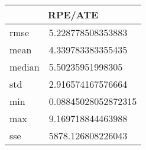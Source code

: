 \begin{table}[!ht] 
 \centering 
 \begin{tabular}{|l|l|} \hline 
 \multicolumn{2}{|c|}{RPE/ATE} \\ \hline 
 rmse & 5.228778508353883 \\ \hline 
mean & 4.339783383355435 \\ \hline 
median & 5.50235951998305 \\ \hline 
std & 2.916574167576664 \\ \hline 
min & 0.08845028052872315 \\ \hline 
max & 9.169718844463988 \\ \hline 
sse & 5878.126808226043 \\ \hline 
\end{tabular} 
 \end{table}